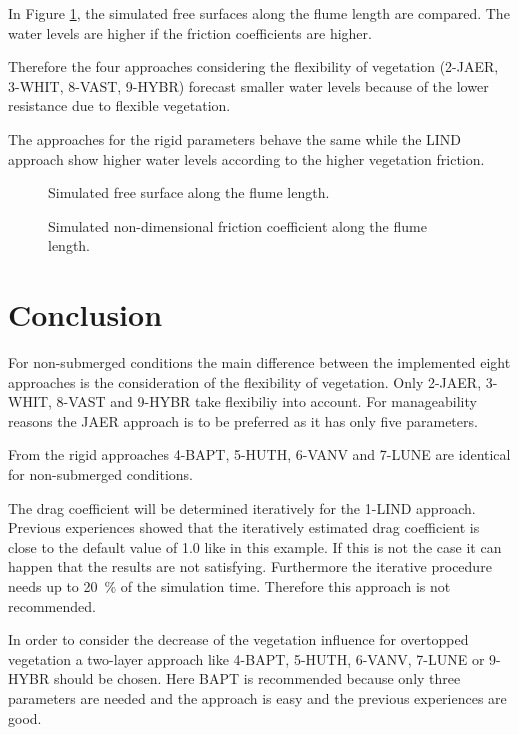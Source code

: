 In Figure \ref{t2d:vegetation:free_surface}, the simulated free surfaces along
the flume length are compared.
The water levels are higher if the friction coefficients are higher.

Therefore the four approaches considering the flexibility of vegetation
(2-JAER, 3-WHIT, 8-VAST, 9-HYBR) forecast smaller water levels because of the lower
resistance due to flexible vegetation. 

The approaches for the rigid parameters behave the same while the LIND approach
show higher water levels according to the higher vegetation friction.

\begin{figure}[h!]
\centering
{}
\caption{Simulated free surface along the flume length.}
\label{t2d:vegetation:free_surface}
\end{figure}

\begin{figure}[h!]
\centering
{}
\caption{Simulated non-dimensional friction coefficient along the flume length.}
\label{t2d:vegetation:cf}
\end{figure}


\section{Conclusion}
For non-submerged conditions the main difference between the implemented eight
approaches is the consideration of the flexibility of vegetation.
Only 2-JAER, 3-WHIT, 8-VAST and 9-HYBR take flexibiliy into account.
For manageability reasons the JAER approach is to be preferred as it has only
five parameters.
\newline

From the rigid approaches 4-BAPT, 5-HUTH, 6-VANV and 7-LUNE are identical for
non-submerged conditions. 

The drag coefficient will be determined iteratively for the 1-LIND approach.
Previous experiences showed that the iteratively estimated drag coefficient is
close to the default value of 1.0 like in this example. If this is not the case
it can happen that the results are not satisfying. Furthermore the iterative procedure
needs up to 20~\% of the simulation time. Therefore this approach is not recommended.
\newline

In order to consider the decrease of the vegetation influence for overtopped
vegetation a two-layer approach like 4-BAPT, 5-HUTH, 6-VANV, 7-LUNE or 9-HYBR should be chosen.
Here BAPT is recommended because only three parameters are needed and
the approach is easy and the previous experiences are good. 
